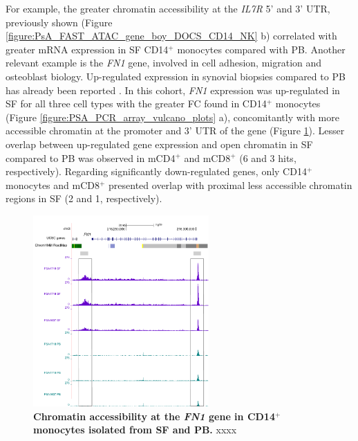 For example, the greater chromatin accessibility at the \textit{IL7R} 5' and 3' UTR, previously shown (Figure \ref{figure:PsA_FAST_ATAC_gene_boy_DOCS_CD14_NK} b) correlated with greater mRNA expression in SF CD14$^+$ monocytes compared with PB. Another relevant example is the \textit{FN1} gene, involved in cell adhesion, migration and osteoblast biology. Up-regulated expression in synovial biopsies compared to PB has already been reported \parencite{Dolcino2015}. In this cohort, \textit{FN1} expression was up-regulated in SF for all three cell types with the greater FC found in CD14$^+$ monocytes (Figure \ref{figure:PSA_PCR_array_vulcano_plots} a), concomitantly with more accessible chromatin at the promoter and 3' UTR of the gene (Figure \ref{figure:PSA_CD14_ATAC_FN1}). Lesser overlap between up-regulated gene expression and open chromatin in SF compared to PB was observed in mCD4$^+$ and mCD8$^+$ (6 and 3 hits, respectively). Regarding significantly down-regulated genes, only CD14$^+$ monocytes and mCD8$^+$ presented overlap with proximal less accessible chromatin regions in SF (2 and 1, respectively). 
	
\begin{figure}[htbp]
\centering
\includegraphics[width=0.6\textwidth]{./Results3/pdfs/PSA_CD14_ATAC_FN1_paired_gene_expression}
\caption[Chromatin accessibility landscape at the \textit{FN1} gene in CD14$^+$ monocytes isolated from SF and PB.]{\textbf{Chromatin accessibility at the \textit{FN1} gene in CD14$^+$ monocytes isolated from SF and PB.} xxxx }
\label{figure:PSA_CD14_ATAC_FN1}
\end{figure}

